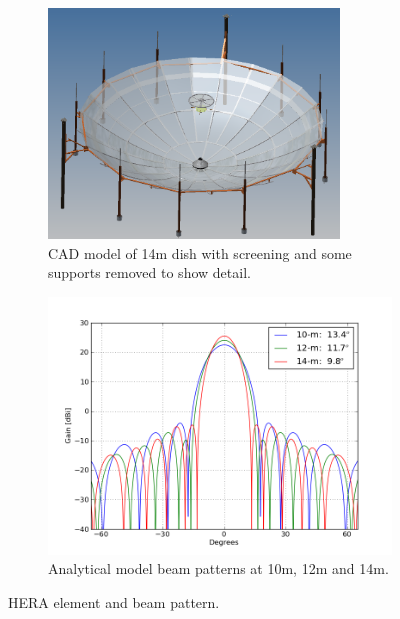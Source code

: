 \documentclass[preprint]{aastex}
\begin{document}
\begin{figure}[h]
	\centering
	\begin{subfigure}[b]{0.46\textwidth}
		\includegraphics[width=0.85\textwidth]{plots/dish.png}
		\caption{CAD model of 14m dish with screening and some supports removed to show detail.}
		\label{fig:dish} 
	\end{subfigure}
\quad
	\begin{subfigure}[b]{0.46\textwidth}
		\includegraphics[width=\textwidth]{plots/Engineering/hera_beam.png}
		\caption{Analytical model beam patterns at 10m, 12m and 14m.}
		\label{fig:beam} 
	\end{subfigure}
	\caption{HERA element and beam pattern.}
\end{figure}

\end{document}
